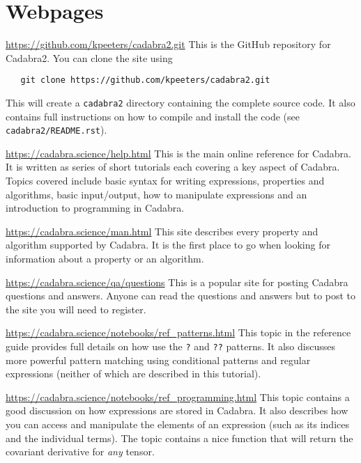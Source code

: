 \documentclass[a4paper,12pt]{article}
\numberwithin{equation}{section}%
\begin{document}
\lstset{numbers=none}

\clearpage

\section*{Webpages}

\url{https://github.com/kpeeters/cadabra2.git}\Break
This is the GitHub repository for Cadabra2. You can clone the site using
\begin{lstlisting}
   git clone https://github.com/kpeeters/cadabra2.git
\end{lstlisting}
This will create a \verb|cadabra2| directory containing the complete source code. It also
contains full instructions on how to compile and install the code (see
\verb|cadabra2/README.rst|).

\url{https://cadabra.science/help.html}\Break
This is the main online reference for Cadabra. It is written as series of short tutorials
each covering a key aspect of Cadabra. Topics covered include basic syntax for writing
expressions, properties and algorithms, basic input/output, how to manipulate expressions and
an introduction to programming in Cadabra.

\url{https://cadabra.science/man.html}\Break
This site describes every property and algorithm supported by Cadabra. It is the
first place to go when looking for information about a property or an algorithm.

\url{https://cadabra.science/qa/questions}\Break
This is a popular site for posting Cadabra questions and answers. Anyone can read the
questions and answers but to post to the site you will need to register.

\url{https://cadabra.science/notebooks/ref_patterns.html}\Break
This topic in the reference guide provides full details on how use the \verb|?| and
\verb|??| patterns. It also discusses more powerful pattern matching using conditional
patterns and regular expressions (neither of which are described in this tutorial).

\url{https://cadabra.science/notebooks/ref_programming.html}\Break
This topic contains a good discussion on how expressions are stored in Cadabra. It also
describes how you can access and manipulate the elements of an expression (such as its
indices and the individual terms). The topic contains a nice function that will return the
covariant derivative for \emph{any} tensor.
\end{document}
